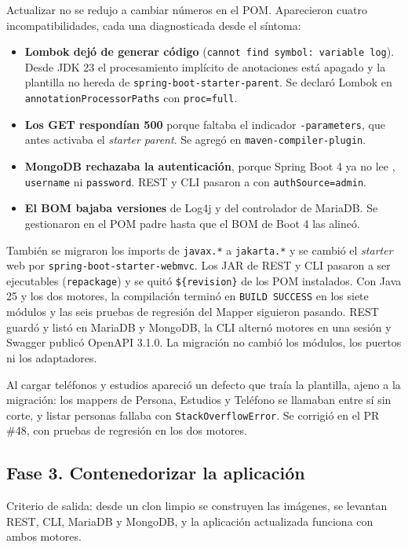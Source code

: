 \documentclass[11pt,a4paper]{article}
\begin{document}
Actualizar no se redujo a cambiar números en el POM. Aparecieron cuatro
incompatibilidades, cada una diagnosticada desde el síntoma:
\begin{itemize}
\item \textbf{Lombok dejó de generar código} (\texttt{cannot find symbol: variable
log}). Desde JDK 23 el procesamiento implícito de anotaciones está apagado y la
plantilla no hereda de \texttt{spring-boot-starter-parent}. Se declaró Lombok en
\texttt{annotationProcessorPaths} con \texttt{proc=full}.
\item \textbf{Los GET respondían 500} porque faltaba el indicador
\texttt{-parameters}, que antes activaba el \emph{starter parent}. Se agregó en
\texttt{maven-compiler-plugin}.
\item \textbf{MongoDB rechazaba la autenticación}, porque Spring Boot 4 ya no lee
, \texttt{username} ni \texttt{password}. REST y
CLI pasaron a  con \texttt{authSource=admin}.
\item \textbf{El BOM bajaba versiones} de Log4j y del controlador de MariaDB. Se
gestionaron en el POM padre hasta que el BOM de Boot 4 las alineó.
\end{itemize}
También se migraron los imports de \texttt{javax.*} a \texttt{jakarta.*} y se
cambió el \emph{starter} web por \texttt{spring-boot-starter-webmvc}. Los JAR de
REST y CLI pasaron a ser ejecutables (\texttt{repackage}) y se quitó
\texttt{\$\{revision\}} de los POM instalados. Con Java 25 y los dos motores, la
compilación terminó en \texttt{BUILD SUCCESS} en los siete módulos y las seis
pruebas de regresión del Mapper siguieron pasando. REST guardó y listó en
MariaDB y MongoDB, la CLI alternó motores en una sesión y Swagger publicó OpenAPI
3.1.0. La migración no cambió los módulos, los puertos ni los adaptadores.

Al cargar teléfonos y estudios apareció un defecto que traía la plantilla, ajeno
a la migración: los mappers de Persona, Estudios y Teléfono se llamaban entre sí
sin corte, y listar personas fallaba con \texttt{StackOverflowError}. Se corrigió
en el PR \#48, con pruebas de regresión en los dos motores.

\subsection{Fase 3. Contenedorizar la aplicación}
Criterio de salida: desde un clon limpio se construyen las imágenes, se levantan
REST, CLI, MariaDB y MongoDB, y la aplicación actualizada funciona con ambos
motores.
\end{document}
